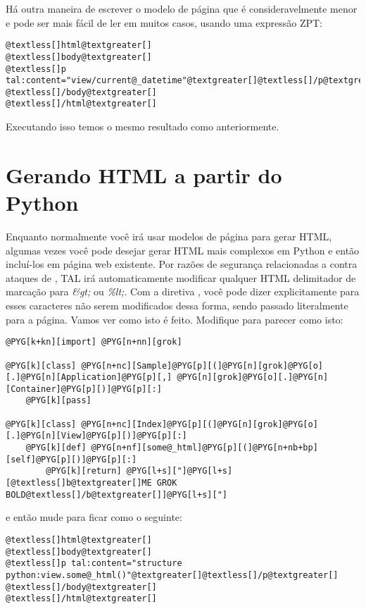 \documentclass[a4paper,12pt,portuguese]{manual}
\begin{document}
Há outra maneira de escrever o modelo de página que é consideravelmente menor e
pode ser mais fácil de ler em muitos casos, usando uma expressão ZPT:

\begin{Verbatim}[commandchars=@\[\]]
@textless[]html@textgreater[]
@textless[]body@textgreater[]
@textless[]p tal:content="view/current@_datetime"@textgreater[]@textless[]/p@textgreater[]
@textless[]/body@textgreater[]
@textless[]/html@textgreater[]
\end{Verbatim}

Executando isso temos o mesmo resultado como anteriormente.


\section{Gerando HTML a partir do Python}

Enquanto normalmente você irá usar modelos de página para gerar HTML, algumas
vezes você pode desejar gerar HTML mais complexos em Python e então
incluí-los em página web existente. Por razões de segurança
relacionadas a  contra ataques de , TAL irá
automaticamente modificar qualquer HTML delimitador de marcação para
\emph{\&gt;} ou \emph{\%lt;}. Com a diretiva , você pode dizer
explicitamente para esses caracteres não serem modificados dessa forma, sendo passado literalmente para a página. Vamos ver como isto é feito. Modifique  para
parecer como isto:

\begin{Verbatim}[commandchars=@\[\]]
@PYG[k+kn][import] @PYG[n+nn][grok]
  
@PYG[k][class] @PYG[n+nc][Sample]@PYG[p][(]@PYG[n][grok]@PYG[o][.]@PYG[n][Application]@PYG[p][,] @PYG[n][grok]@PYG[o][.]@PYG[n][Container]@PYG[p][)]@PYG[p][:]
    @PYG[k][pass]

@PYG[k][class] @PYG[n+nc][Index]@PYG[p][(]@PYG[n][grok]@PYG[o][.]@PYG[n][View]@PYG[p][)]@PYG[p][:]
    @PYG[k][def] @PYG[n+nf][some@_html]@PYG[p][(]@PYG[n+nb+bp][self]@PYG[p][)]@PYG[p][:]
        @PYG[k][return] @PYG[l+s]["]@PYG[l+s][@textless[]b@textgreater[]ME GROK BOLD@textless[]/b@textgreater[]]@PYG[l+s]["]
\end{Verbatim}

e então mude  para ficar como o seguinte:

\begin{Verbatim}[commandchars=@\[\]]
@textless[]html@textgreater[]
@textless[]body@textgreater[]
@textless[]p tal:content="structure python:view.some@_html()"@textgreater[]@textless[]/p@textgreater[]
@textless[]/body@textgreater[]
@textless[]/html@textgreater[]
\end{Verbatim}
\end{document}
